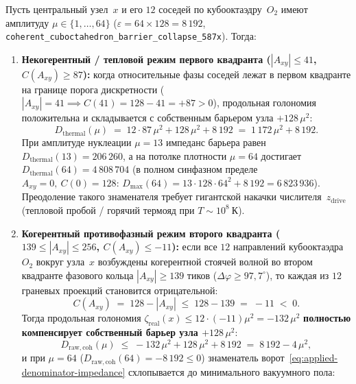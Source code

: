 \begin{theorem}
\label{thm:applied-barrier-collapse}
Пусть центральный узел~$x$ и его $12$ соседей по кубооктаэдру~$O_2$ имеют амплитуду $\mu \in \{1,\dots,64\}$ ($\varepsilon = 64\times 128 = 8\,192$, \texttt{coherent\_\allowbreak cuboctahedron\_\allowbreak barrier\_\allowbreak collapse\_\allowbreak 587x}). Тогда:
\begin{enumerate}[leftmargin=*]
\item \textbf{Некогерентный / тепловой режим первого квадранта ($|A_{xy}| \le 41$, $C(A_{xy}) \ge 87$):}
  когда относительные фазы соседей лежат в первом квадранте на границе порога дискретности ($|A_{xy}| = 41 \implies C(41) = 128 - 41 = +87 > 0$), продольная голономия положительна и складывается с собственным барьером узла $+128\,\mu^2$:
  \begin{equation}
  \label{eq:applied-d-thermal}
    D_{\mathrm{thermal}}(\mu) \;=\; 12\cdot 87\,\mu^2 + 128\,\mu^2 + 8\,192 \;=\; 1\,172\,\mu^2 + 8\,192.
  \end{equation}
  При амплитуде нуклеации $\mu = 13$ импеданс барьера равен $D_{\mathrm{thermal}}(13) = 206\,260$, а на потолке плотности $\mu = 64$ достигает $D_{\mathrm{thermal}}(64) = 4\,808\,704$ (в полном синфазном пределе $A_{xy}=0,\ C(0)=128$: $D_{\max}(64) = 13\cdot 128\cdot 64^2 + 8\,192 = 6\,823\,936$). Преодоление такого знаменателя требует гигантской накачки числителя~$z_{\mathrm{drive}}$ (тепловой пробой / горячий термояд при $T \sim 10^8\ \text{К}$).
\item \textbf{Когерентный противофазный режим второго квадранта ($139 \le |A_{xy}| \le 256$, $C(A_{xy}) \le -11$):}
  если все $12$ направлений кубооктаэдра~$O_2$ вокруг узла~$x$ возбуждены когерентной стоячей волной во втором квадранте фазового кольца $|A_{xy}| \ge 139$ тиков ($\Delta\varphi \ge 97{,}7^\circ$), то каждая из $12$ граневых проекций становится отрицательной:
  \[
    C(A_{xy}) \;=\; 128 - |A_{xy}| \;\le\; 128 - 139 \;=\; -11 \;<\; 0.
  \]
  Тогда продольная голономия $\zeta_{\mathrm{real}}(x) \le 12\cdot(-11)\mu^2 = -132\,\mu^2$ \textbf{полностью компенсирует собственный барьер узла $+128\,\mu^2$}:
  \begin{equation}
  \label{eq:applied-d-coherent}
    D_{\mathrm{raw,coh}}(\mu) \;\le\; -132\,\mu^2 + 128\,\mu^2 + 8\,192 \;=\; 8\,192 - 4\,\mu^2,
  \end{equation}
  и при $\mu = 64$ ($D_{\mathrm{raw,coh}}(64) = -8\,192 \le 0$) знаменатель ворот~\eqref{eq:applied-denominator-impedance} схлопывается до минимального вакуумного пола:

\end{enumerate}
\end{theorem}
